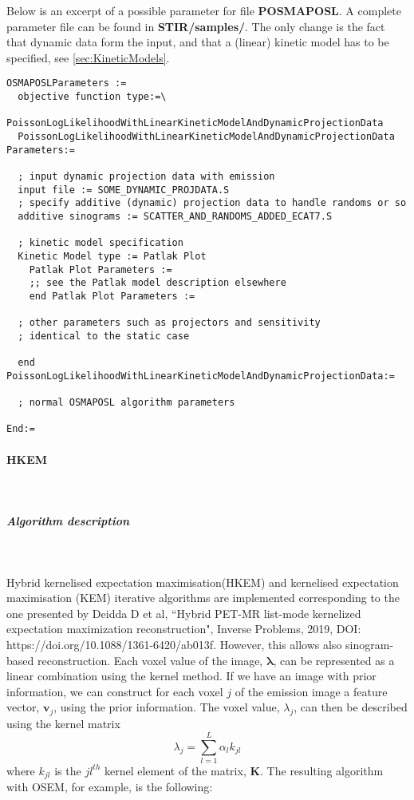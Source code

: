 \documentclass{article}
\newcommand{\subsubsubsection}[1]{\paragraph{#1}\mbox{} \\}
\newcommand{\subsubsubsubsection}[1]{\subparagraph{#1} \mbox{} \\}
\begin{document}
Below is an excerpt of a possible parameter for file \textbf{POSMAPOSL}. A complete parameter file
can be found in \textbf{STIR/samples/}. The only change is the fact that dynamic data
form the input, and that a (linear) kinetic model has to be specified, see \ref{sec:KineticModels}.

\begin{verbatim}
OSMAPOSLParameters :=
  objective function type:=\
     PoissonLogLikelihoodWithLinearKineticModelAndDynamicProjectionData
  PoissonLogLikelihoodWithLinearKineticModelAndDynamicProjectionData Parameters:=

  ; input dynamic projection data with emission
  input file := SOME_DYNAMIC_PROJDATA.S
  ; specify additive (dynamic) projection data to handle randoms or so
  additive sinograms := SCATTER_AND_RANDOMS_ADDED_ECAT7.S

  ; kinetic model specification
  Kinetic Model type := Patlak Plot
    Patlak Plot Parameters :=
    ;; see the Patlak model description elsewhere
    end Patlak Plot Parameters :=

  ; other parameters such as projectors and sensitivity 
  ; identical to the static case

  end PoissonLogLikelihoodWithLinearKineticModelAndDynamicProjectionData:=

  ; normal OSMAPOSL algorithm parameters 

End:=
\end{verbatim}

{ \subsubsubsection{HKEM}
}
\label{sec:HKEM}
  { \subsubsubsubsection{Algorithm description}
  }
  Hybrid kernelised expectation maximisation(HKEM) and kernelised expectation maximisation (KEM) iterative algorithms
  are implemented corresponding to the one presented by Deidda D et al, ``Hybrid PET-MR list-mode kernelized expectation maximization reconstruction",
  Inverse Problems, 2019, DOI: https://doi.org/10.1088/1361-6420/ab013f. However, this allows
  also sinogram-based reconstruction. Each voxel value of the image, $ \boldsymbol{\lambda}$, can be represented as a
  linear combination using the kernel method.  If we have an image with prior information, we can construct for each voxel
  $ j $ of the emission image a feature vector, $ \boldsymbol{v}_j $, using the prior information. The voxel value,
  $\lambda_j$, can then be described using the kernel matrix 
  \[
   \lambda_j=  \sum_{l=1}^L \alpha_l k_{jl}
  \]
  \noindent
  where $k_{jl}$ is the $jl^{th}$ kernel element of the matrix, $\boldsymbol{K}$.
  The resulting algorithm with OSEM, for example, is the following:
\end{document}

